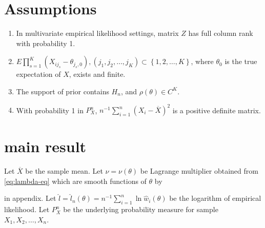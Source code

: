 \documentclass[oneside,english]{amsbook}
\numberwithin{section}{chapter}
\numberwithin{equation}{section}
\numberwithin{figure}{section}
\theoremstyle{plain}
\theoremstyle{plain}
\theoremstyle{definition}
\theoremstyle{plain}
\theoremstyle{plain}
\theoremstyle{remark}
\theoremstyle{definition}
\theoremstyle{definition}
\begin{document}
\section{Assumptions}
\begin{enumerate}
\item \label{enu:multv-diff-full-rank}In multivariate empirical likelihood
settings, matrix $Z$ has full column rank with probability 1. %

\item \label{enu:finite-moment-sample}$E\prod_{s=1}^{K}\left(X_{ij_{s}}-\theta_{j_{s},0}\right),\left(j_{1},j_{2},\ldots,j_{K}\right)\subset\left\{ 1,2,\ldots,K\right\} $,
where $\theta_{0}$ is the true expectation of $X$, exists and finite.

\item \label{enu:smooth-piror}The support of prior contains $H_{n}$, and
$\rho\left(\theta\right)\in C^{K}$. 
\item \label{enu:pd-sample-var}With probability 1 in $P_{X}^{n}$, $n^{-1}\sum_{i=1}^{n}\left(X_{i}-\overline{X}\right)^{2}$
is a positive definite matrix. 
\end{enumerate}

\section{main result\label{sec:main-result}}

Let $\overline{X}$ be the sample mean. Let $\nu=\nu\left(\theta\right)$
be Lagrange multiplier obtained from \ref{eq:lambda-eq} which are
smooth functions of $\theta$ by %

{} in appendix. Let $\hat{l}=\hat{l}_{n}\left(\theta\right)=n^{-1}\sum_{i=1}^{n}\ln\hat{w}_{i}\left(\theta\right)$
be the logarithm of empirical likelihood. Let $P_{X}^{n}$ be the
underlying probability measure for sample $X_{1},X_{2},\ldots,X_{n}$. 
\end{document}
